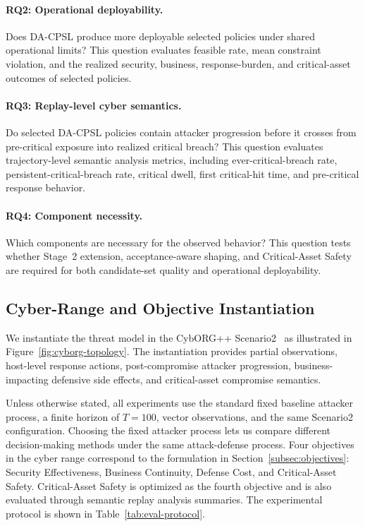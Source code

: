 \documentclass[sigconf,review,anonymous]{acmart}
\begin{document}
\paragraph{RQ2: Operational deployability.}
Does DA-CPSL produce more deployable selected policies under shared
operational limits? This question evaluates feasible rate, mean
constraint violation, and the realized security, business,
response-burden, and critical-asset outcomes of selected policies.

\paragraph{RQ3: Replay-level cyber semantics.}
Do selected DA-CPSL policies contain attacker progression before it
crosses from pre-critical exposure into realized critical breach? This
question evaluates trajectory-level semantic analysis metrics, including
ever-critical-breach rate, persistent-critical-breach rate, critical
dwell, first critical-hit time, and pre-critical response behavior.

\paragraph{RQ4: Component necessity.}
Which components are necessary for the observed behavior?
This question tests whether Stage~2 extension, acceptance-aware shaping,
and Critical-Asset Safety are required for both candidate-set quality and
operational deployability.

\subsection{Cyber-Range and Objective Instantiation}
\label{subsec:eval-cyber-range}

We instantiate the threat model in the CybORG++ Scenario2~\cite{standen2021cyborg,emerson2024cyborgpp}
as illustrated in Figure~\ref{fig:cyborg-topology}. The instantiation
provides partial observations, host-level response actions,
post-compromise attacker progression, business-impacting defensive side
effects, and critical-asset compromise semantics.

Unless otherwise stated, all experiments use the standard fixed baseline
attacker process, a finite horizon of \(T=100\), vector observations, and
the same Scenario2 configuration. Choosing the fixed attacker process
lets us compare different decision-making methods under the same
attack-defense process. Four objectives in the cyber range correspond to
the formulation in Section~\ref{subsec:objectives}: Security
Effectiveness, Business Continuity, Defense Cost, and Critical-Asset
Safety. Critical-Asset Safety is optimized as the fourth objective and is
also evaluated through semantic replay analysis summaries. The
experimental protocol is shown in Table~\ref{tab:eval-protocol}.
\end{document}
